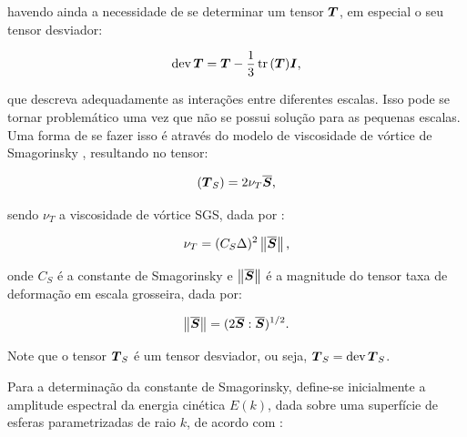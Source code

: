 \noindent havendo ainda a necessidade de se determinar um tensor $\boldsymbol{T}$, em especial o seu tensor desviador:

\begin{equation}
    \mathop{\mathrm{dev}}\nolimits{\boldsymbol{T}}=\boldsymbol{T}-\frac{1}{3}\mathop{\mathrm{tr}}\nolimits{(\boldsymbol{T})}\boldsymbol{I}\text{,}
\end{equation}

\noindent que descreva adequadamente as interações entre diferentes escalas. Isso pode se tornar problemático uma vez que não se possui solução para as pequenas escalas. Uma forma de se fazer isso é através do modelo de viscosidade de vórtice de Smagorinsky \cite{smagorinsky1963general}, resultando no tensor:

\begin{equation}
    \left({\boldsymbol{T}_S}\right)=2\nu_T\overline{\boldsymbol{S}}\text{,}
\end{equation}

\noindent sendo $\nu_T$ a viscosidade de vórtice SGS, dada por \cite{germano1991dynamic,piomelli1999large,hughes2000large,bailly2015turbulence,katopodes2019free}:

\begin{equation}
    \nu_T=(C_S\Delta)^2\left\lVert{\overline{\boldsymbol{S}}}\right\lVert\text{,}
\end{equation}

\noindent onde $C_S$ é a constante de Smagorinsky e $\left\lVert{\overline{\boldsymbol{S}}}\right\lVert$ é a magnitude do tensor taxa de deformação em escala grosseira, dada por:

\begin{equation}
    \left\lVert{\overline{\boldsymbol{S}}}\right\lVert=(2\overline{\boldsymbol{S}}:\overline{\boldsymbol{S}})^{1/2}\text{.}
\end{equation}

Note que o tensor $\boldsymbol{T}_S$ é um tensor desviador, ou seja, $\boldsymbol{T}_S=\mathop{\mathrm{dev}}\nolimits{\boldsymbol{T}_S}$.

%

Para a determinação da constante de Smagorinsky, define-se inicialmente a amplitude espectral da energia cinética $E(k)$, dada sobre uma superfície de esferas parametrizadas de raio $k$, de acordo com \cite{hughes2000large}:

